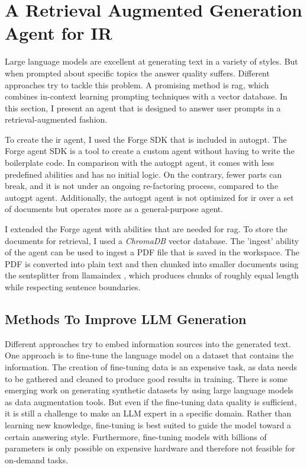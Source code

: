 \documentclass[../main.tex]{subfiles}
\begin{document}
\chapter{A Retrieval Augmented Generation Agent for IR}
\label{ch:agent}

Large language models are excellent at generating text in a variety of styles.
But when prompted about specific topics the answer quality suffers.
Different approaches try to tackle this problem.
A promising method is \gls{rag}, which combines in-context learning prompting techniques with a vector database.
In this section, I present an agent that is designed to answer user prompts in a retrieval-augmented fashion.

To create the \gls{ir} agent,
I used the Forge SDK \autocite{zotero-117} that is included in \gls{autogpt}.
The Forge agent SDK is a tool to create a custom agent without having to write the boilerplate code.
In comparison with the \gls{autogpt} agent, it comes with less predefined abilities and has no initial logic.
On the contrary, fewer parts can break, and it is not under an ongoing re-factoring process,
compared to the \gls{autogpt} agent.
Additionally, the \gls{autogpt} agent is not optimized for \gls{ir} over a set of documents
but operates more as a general-purpose agent.

I extended the Forge agent with abilities that are needed for \gls{rag}.
To store the documents for retrieval, I used a \emph{ChromaDB} vector database.
The 'ingest' ability of the agent can be used to ingest a PDF file that is saved in the workspace.
The PDF is converted into plain text and then chunked into smaller documents using the \gls{sentsplitter} from \gls{llamaindex} \cite{zotero-255},
which produces chunks of roughly equal length while respecting sentence boundaries.

\section{Methods To Improve LLM Generation}

Different approaches try to embed information sources into the generated text.
One approach is to fine-tune the language model on a dataset that contains the information.
The creation of fine-tuning data is an expensive task, as data needs to be gathered and cleaned to produce good results in training.
There is some emerging work on generating synthetic datasets by using large language models as data augmentation tools.
But even if the fine-tuning data quality is sufficient, it is still a challenge to make an LLM expert in a specific domain.
Rather than learning new knowledge, fine-tuning is best suited to guide the model toward a certain answering style.
Furthermore, fine-tuning models with billions of parameters is only possible on expensive hardware and therefore not feasible for on-demand tasks.
\end{document}
